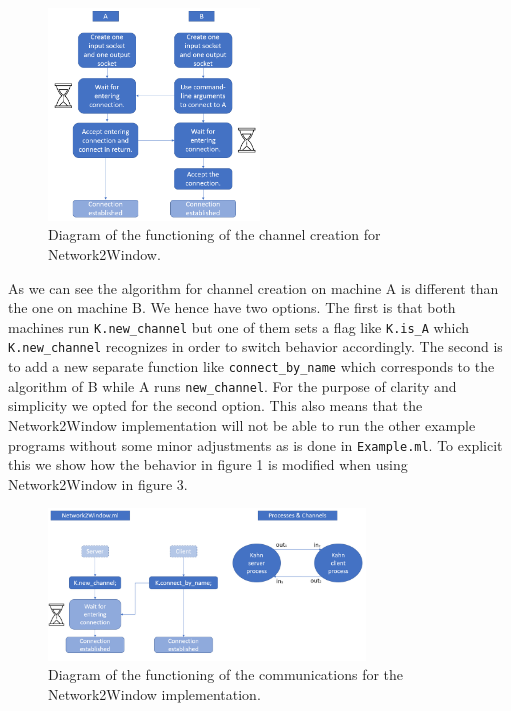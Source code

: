\documentclass[10pt,a4paper]{article}
\begin{document}
\begin{figure}[h!]
   \centering
   \includegraphics[width = 0.5\textwidth]{diagram3.png}
   \caption{Diagram of the functioning of the channel creation for Network2Window.}
   \label{fig:my_label}
\end{figure}

As we can see the algorithm for channel creation on machine A is different than the one on machine B. We hence have two options. The first is that both machines run \texttt{K.new\_channel} but one of them sets a flag like \texttt{K.is\_A} which \texttt{K.new\_channel} recognizes in order to switch behavior accordingly. The second is to add a new separate function like \texttt{connect\_by\_name} which corresponds to the algorithm of B while A runs \texttt{new\_channel}. For the purpose of clarity and simplicity we opted for the second option. This also means that the Network2Window implementation will not be able to run the other example programs without some minor adjustments as is done in \texttt{Example.ml}. To explicit this we show how the behavior in figure 1 is modified when using Network2Window in figure 3.

\begin{figure}[h!]
   \centering
   \includegraphics[width = 0.75\textwidth]{diagram2.png}
   \caption{Diagram of the functioning of the communications for the Network2Window implementation.}
   \label{fig:my_label}
\end{figure}
\end{document}
